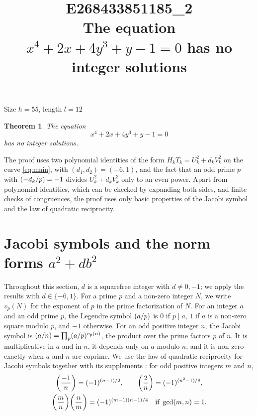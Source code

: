 \documentclass[11pt]{article}
\title{\textbf{E268433851185\_2}\\[4pt] {\Large The equation $x^{4}+2x+4y^{3}+y-1=0$ has no integer solutions}}
\author{}
\date{}
\newtheorem{theorem}{Theorem}
\newcommand{\leg}[2]{\mathchoice{\biggl(\dfrac{#1}{#2}\biggr)}{(#1/#2)}{(#1/#2)}{(#1/#2)}}
\begin{document}
\maketitle
\vspace{-8ex}
\begin{center}
Size $h=55$, length $l=12$
\end{center}

\begin{theorem}\label{thm:main}
The equation
\begin{equation}\label{eq:main}
x^{4}+2x+4y^{3}+y-1=0
\end{equation}
has no integer solutions.
\end{theorem}

The proof uses two polynomial identities of the form $H_kT_k=U_k^2+d_kV_k^2$ on the curve \eqref{eq:main}, with $(d_1,d_2)=(-6,1)$, and the fact that an odd prime $p$ with $\leg{-d_k}{p}=-1$ divides $U_k^2+d_kV_k^2$ only to an even power. Apart from polynomial identities, which can be checked by expanding both sides, and finite checks of congruences, the proof uses only basic properties of the Jacobi symbol and the law of quadratic reciprocity.

\section{Jacobi symbols and the norm forms $a^2+db^2$}

Throughout this section, $d$ is a squarefree integer with $d\neq0,-1$; we apply the results with $d\in\{-6,1\}$. For a prime $p$ and a non-zero integer $N$, we write $v_p(N)$ for the exponent of $p$ in the prime factorization of $N$. For an integer $a$ and an odd prime $p$, the Legendre symbol $\leg{a}{p}$ is $0$ if $p\mid a$, $1$ if $a$ is a non-zero square modulo $p$, and $-1$ otherwise. For an odd positive integer $n$, the Jacobi symbol is $\leg{a}{n}=\prod_p\leg{a}{p}^{v_p(n)}$, the product over the prime factors $p$ of $n$. It is multiplicative in $a$ and in $n$, it depends only on $a$ modulo $n$, and it is non-zero exactly when $a$ and $n$ are coprime. We use the law of quadratic reciprocity for Jacobi symbols together with its supplements \cite[Chapter~5, \S2]{IR}: for odd positive integers $m$ and $n$,
\begin{gather*}
\leg{-1}{n}=(-1)^{(n-1)/2},\qquad\leg{2}{n}=(-1)^{(n^2-1)/8},\\
\leg{m}{n}\leg{n}{m}=(-1)^{(m-1)(n-1)/4}\quad\text{if }\gcd(m,n)=1.
\end{gather*}
\end{document}
